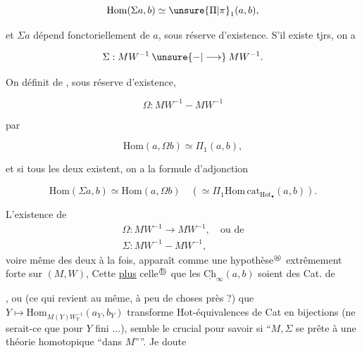 
\[
 \mathrm{Hom}(\Sigma a,b)\simeq\unsure{\Pi|\pi}_1(a,b),
\]

et $\Sigma a$ dépend fonctoriellement de $a$, sous réserve d'existence. S'il existe tjrs, on a

\[
 \Sigma:MW^{-1}\mathbin{\unsure{-|\longrightarrow}}MW^{-1}.
\]

On définit de , sous réserve d'existence,

\[
 \Omega:MW^{-1}\mathbin{-}MW^{-1}
\]

par

\[
 \mathrm{Hom}(a,\Omega b)\simeq\Pi_1(a,b),
\]

et si tous les deux existent, on a la formule d'adjonction

\[
 \mathrm{Hom}(\Sigma a,b)\simeq\mathrm{Hom}(a,\Omega b)
 \quad(\simeq\Pi_1\mathrm{Hom\,cat}_{\mathrm{Hot}_{\bullet}}(a,b)).
\]

 L'existence de
\[
 \begin{aligned}
 \Omega:MW^{-1}\longrightarrow MW^{-1},&\ \text{ou de}\\
 \Sigma:MW^{-1}\mathbin{-}MW^{-1},&
 \end{aligned}
\]
voire même des deux à la fois, apparaît comme une hypothèse$^{\text{\textcircled{\scriptsize a}}}$ extrêmement forte sur $(M,W)$,  Cette   \uline{plus} celle$^{\text{\textcircled{\scriptsize b}}}$ que les $\underline{\mathrm{Ch}}_{\infty}(a,b)$ soient  des Cat. de

,  ou (ce qui revient au même, à peu de choses près ?) que $Y\longmapsto\mathrm{Hom}_{M(Y)W_Y^{-1}}(a_Y,b_Y)$ transforme Hot-équivalences de Cat en bijections (ne serait-ce que pour $Y$ fini $\ldots$), semble le  crucial pour savoir si ``$M,\Sigma$ se prête à une théorie  \deleted{\unsure{$\Sigma$}} homotopique ``dans $M$''''. Je doute 
